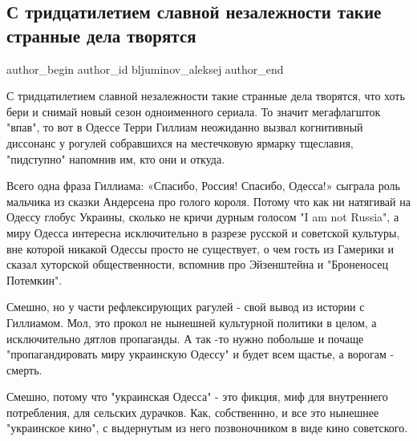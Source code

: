  
 
 
 
 
 
\subsection{С тридцатилетием славной незалежности такие странные дела творятся}
\label{sec:23_08_2021.fb.bljuminov_aleksej.1.nezalezhnist_30_let_dela}
 
\ifcmt
 author_begin
   author_id bljuminov_aleksej
 author_end
\fi

С тридцатилетием славной незалежности такие странные дела творятся, что хоть
бери и снимай новый сезон одноименного сериала. То значит мегафлагшток "впав",
то  вот в Одессе Терри Гиллиам неожиданно вызвал когнитивный диссонанс у
рогулей собравшихся на местечковую ярмарку тщеславия, "пидступно" напомнив им,
кто они и откуда.

 Всего одна фраза Гиллиама: «Спасибо, Россия! Спасибо, Одесса!» сыграла роль
мальчика из сказки Андерсена про голого короля. Потому что как ни натягивай на
Одессу глобус Украины, сколько не кричи дурным голосом "I am not Russia", а
миру Одесса интересна исключительно в разрезе русской и советской культуры, вне
которой никакой Одессы просто не существует, о чем гость из Гамерики и сказал
хуторской общественности, вспомнив про Эйзенштейна и "Броненосец Потемкин". 

Смешно, но у части рефлексирующих рагулей - свой вывод из истории с Гиллиамом.
Мол, это прокол не нынешней культурной политики в целом, а исключительно дятлов
пропаганды. А так -то нужно побольше и почаще "пропагандировать миру украинскую
Одессу" и будет всем щастье, а ворогам - смерть. 

Смешно, потому что "украинская Одесса" - это фикция, миф для внутреннего
потребления, для сельских дурачков. Как, собственнно, и все это нынешнее
"украинское кино", с выдернутым из него позвоночником в виде кино советского. 

